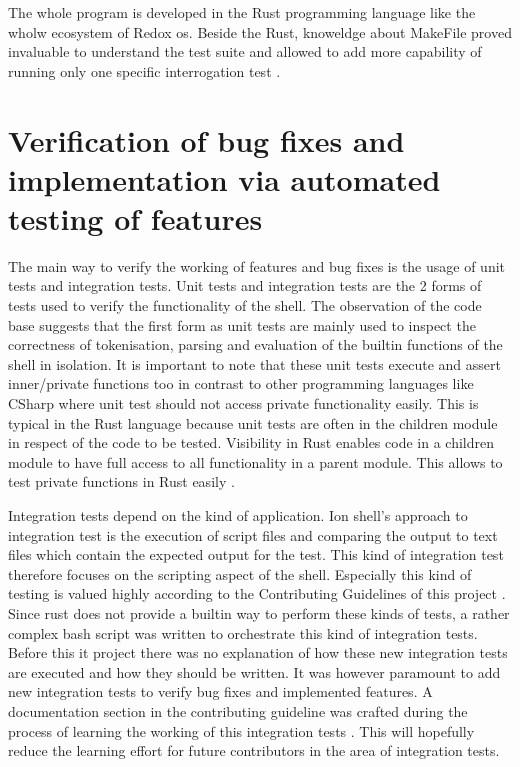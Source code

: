 The whole program is developed in the Rust programming language like the wholw ecosystem of Redox os.
Beside the Rust, knoweldge about MakeFile proved invaluable to understand the test suite and
allowed to add more capability of running only one specific interrogation test \cite{}.


\section{Verification of bug fixes and implementation via automated testing of features}\label{impl:integration_test}

The main way to verify the working of features and bug fixes is the usage of unit tests and integration tests.
Unit tests and integration tests are the 2 forms of tests used to verify the functionality of the shell.
The observation of the code base suggests that the first form as unit tests are mainly used to inspect the correctness of tokenisation, parsing and
evaluation of the builtin functions of the shell in isolation.
It is important to note that these unit tests execute and assert inner/private functions too
in contrast to other programming languages like CSharp where unit test should not access private functionality easily.
This is typical in the Rust language because unit tests are often in the children module in respect of the code to be tested.
Visibility in Rust enables code in a children module to have full access to all functionality in a parent module.
This allows to test private functions in Rust easily \cite{rust_testing_private_function}.

Integration tests depend on the kind of application.
Ion shell's approach to integration test is the execution of script files
and comparing the output to text files which contain the expected output for the test.
This kind of integration test therefore focuses on the scripting aspect of the shell.
Especially this kind of testing is valued highly according to the Contributing Guidelines of this project \cite{ion_shell_contributing}.
Since rust does not provide a builtin way to perform these kinds of tests,
a rather complex bash script was written to orchestrate this kind of integration tests.
Before this it project there was no explanation of how these new integration tests are executed and how they should be written.
It was however paramount to add new integration tests to verify bug fixes and implemented features.
A documentation section in the contributing guideline was crafted during the process of
learning the working of this integration tests \cite{ion_shell_contributing}.
This will hopefully reduce the learning effort for future contributors in the area of integration tests.

